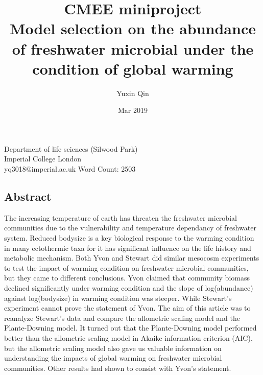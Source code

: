 \documentclass[11pt]{article}
\title{
CMEE miniproject \\
\textbf{ Model selection on the abundance of freshwater microbial under the condition of global warming}}
\author{Yuxin Qin }
\date{Mar 2019}
\begin{document}
\maketitle

\begin{center}
Department of life sciences (Silwood Park)\\
Imperial College London  \\
\bigbreak
yq3018@imperial.ac.uk
\bigbreak
\bigbreak
\bigbreak
\bigbreak
\bigbreak
\bigbreak
Word Count: 2503
\end{center}

\newpage

\begin{linenumbers}
\section*{Abstract}
The increasing temperature of earth has threaten the freshwater microbial communities due to the vulnerability and temperature dependancy of freshwater system. Reduced bodysize is a key biological response to the warming condition in many ectothermic taxa for it has significant influence on the life history and metabolic mechanism. Both Yvon and Stewart did similar mesocosm experiments to test the impact of warming condition on freshwater microbial communities, but they came to different conclusions. Yvon claimed that community biomass declined significantly under warming condition and the slope of log(abundance) against log(bodysize) in warming condition was steeper. While Stewart's experiment cannot prove the statement of Yvon.
The aim of this article was to reanalyze Stewart's data and compare the allometric scaling model and the Plante-Downing model. It turned out that the Plante-Downing model performed better than the allometric scaling model in Akaike information criterion (AIC), but the allometric scaling model also gave us valuable information on understanding the impacts of global warming on freshwater microbial communities. Other results had shown to consist with Yvon's statement.




\end{linenumbers}
\end{document}
